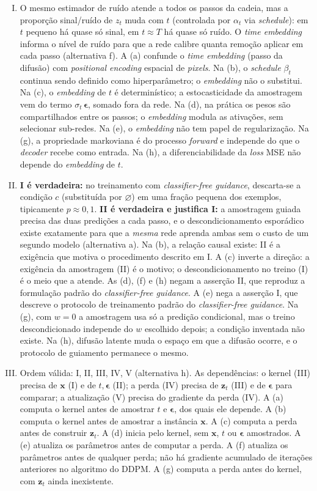 \documentclass{dlproblemset}
\begin{document}
\begin{enumerate}[I)]
    \item O mesmo estimador de ruído atende a todos os passos da cadeia, mas a proporção sinal/ruído de $z_t$ muda com $t$ (controlada por $\alpha_t$ via \textit{schedule}): em $t$ pequeno há quase só sinal, em $t \approx T$ há quase só ruído. O \textit{time embedding} informa o nível de ruído para que a rede calibre quanta remoção aplicar em cada passo (alternativa f). A (a) confunde o \textit{time embedding} (passo da difusão) com \textit{positional encoding} espacial de \textit{pixels}. Na (b), o \textit{schedule} $\beta_t$ continua sendo definido como hiperparâmetro; o \textit{embedding} não o substitui. Na (c), o \textit{embedding} de $t$ é determinístico; a estocasticidade da amostragem vem do termo $\sigma_t\,\boldsymbol{\epsilon}$, somado fora da rede. Na (d), na prática os pesos são compartilhados entre os passos; o \textit{embedding} modula as ativações, sem selecionar sub-redes. Na (e), o \textit{embedding} não tem papel de regularização. Na (g), a propriedade markoviana é do processo \textit{forward} e independe do que o \textit{decoder} recebe como entrada. Na (h), a diferenciabilidade da \emph{loss} MSE não depende do \textit{embedding} de $t$.
    \item \textbf{I é verdadeira:} no treinamento com \textit{classifier-free guidance}, descarta-se a condição $c$ (substituída por $\varnothing$) em uma fração pequena dos exemplos, tipicamente $p \approx 0{,}1$. \textbf{II é verdadeira e justifica I:} a amostragem guiada precisa das duas predições a cada passo, e o descondicionamento esporádico existe exatamente para que a \emph{mesma} rede aprenda ambas sem o custo de um segundo modelo (alternativa a). Na (b), a relação causal existe: II é a exigência que motiva o procedimento descrito em I. A (c) inverte a direção: a exigência da amostragem (II) é o motivo; o descondicionamento no treino (I) é o meio que a atende. As (d), (f) e (h) negam a asserção II, que reproduz a formulação padrão do \textit{classifier-free guidance}. A (e) nega a asserção I, que descreve o protocolo de treinamento padrão do \textit{classifier-free guidance}. Na (g), com $w = 0$ a amostragem usa só a predição condicional, mas o treino descondicionado independe do $w$ escolhido depois; a condição inventada não existe. Na (h), difusão latente muda o espaço em que a difusão ocorre, e o protocolo de guiamento permanece o mesmo.
    \item Ordem válida: I, II, III, IV, V (alternativa h). As dependências: o kernel (III) precisa de $\mathbf{x}$ (I) e de $t, \boldsymbol{\epsilon}$ (II); a perda (IV) precisa de $\mathbf{z}_t$ (III) e de $\boldsymbol{\epsilon}$ para comparar; a atualização (V) precisa do gradiente da perda (IV). A (a) computa o kernel antes de amostrar $t$ e $\boldsymbol{\epsilon}$, dos quais ele depende. A (b) computa o kernel antes de amostrar a instância $\mathbf{x}$. A (c) computa a perda antes de construir $\mathbf{z}_t$. A (d) inicia pelo kernel, sem $\mathbf{x}$, $t$ ou $\boldsymbol{\epsilon}$ amostrados. A (e) atualiza os parâmetros antes de computar a perda. A (f) atualiza os parâmetros antes de qualquer perda; não há gradiente acumulado de iterações anteriores no algoritmo do DDPM. A (g) computa a perda antes do kernel, com $\mathbf{z}_t$ ainda inexistente.

\end{enumerate}
\end{document}
